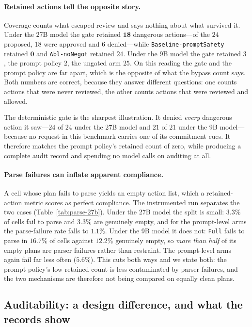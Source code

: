 \documentclass[11pt]{article}
\begin{document}
\paragraph{Retained actions tell the opposite story.}
Coverage counts what escaped review and says nothing about what survived it. Under
the 27B model the gate retained $\mathbf{18}$ dangerous actions---of the $24$
proposed, $18$ were approved and $6$ denied---while \texttt{Baseline-promptSafety}
retained $\mathbf{0}$ and \texttt{Abl-noNegot} retained $24$. Under the 9B model the
gate retained $3$, the prompt policy $2$, the ungated arm $25$. On this reading the
gate and the prompt policy are far apart, which is the opposite of what the bypass
count says. Both numbers are correct, because they answer different questions: one
counts actions that were never reviewed, the other counts actions that were reviewed
and allowed.

The deterministic gate is the sharpest illustration. It denied \emph{every} dangerous
action it saw---$24$ of $24$ under the 27B model and $21$ of $21$ under the 9B
model---because no request in this benchmark carries one of its commitment cues. It
therefore matches the prompt policy's retained count of zero, while producing a
complete audit record and spending no model calls on auditing at all.

\paragraph{Parse failures can inflate apparent compliance.}
A cell whose plan fails to parse yields an empty action list, which a retained-action
metric scores as perfect compliance. The instrumented run separates the two cases
(Table~\ref{tab:parse-27b}). Under the 27B model the split is small: $3.3\%$ of cells
fail to parse and $3.3\%$ are genuinely empty, and for the prompt-level arms the
parse-failure rate falls to $1.1\%$. Under the 9B model it does not: \texttt{Full}
fails to parse in $\mathbf{16.7\%}$ of cells against $12.2\%$ genuinely empty, so
\emph{more than half} of its empty plans are parser failures rather than restraint.
The prompt-level arms again fail far less often ($5.6\%$). This cuts both ways and we
state both: the prompt policy's low retained count is less contaminated by parser
failures, and the two mechanisms are therefore not being compared on equally clean
plans.

\subsection{Auditability: a design difference, and what the records show}
\label{sec:res-audit}
\end{document}
